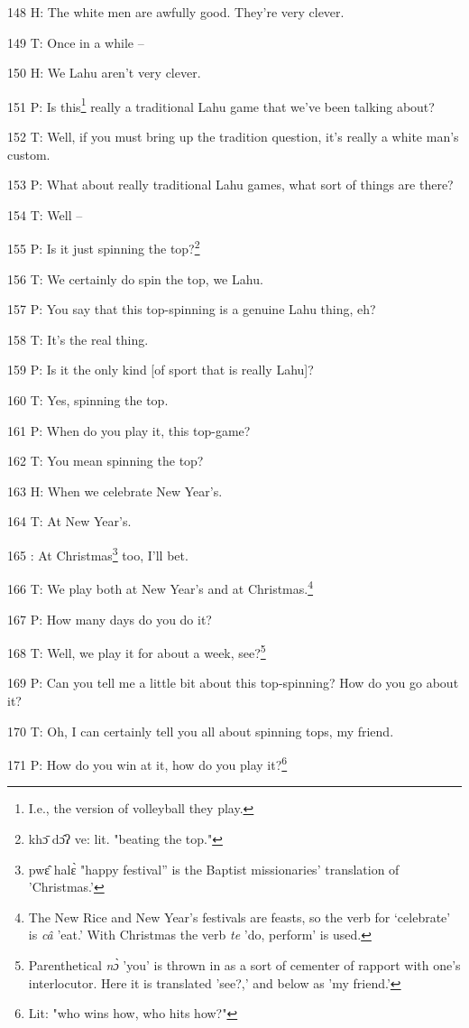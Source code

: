 148 H: The white men are awfully good. They're very clever.

149 T: Once in a while --

150 H: We Lahu aren't very clever.

151 P: Is this\footnote{I.e., the version of volleyball they play.} really a traditional Lahu game that we've been talking about?

152 T: Well, if you must bring up the tradition question, it's really a white man's
custom.

153 P: What about really traditional Lahu games, what sort of things are there?

154 T: Well --

155 P: Is it just spinning the top?\footnote{khɔ̄ dɔ̂ʔ ve: lit. "beating the top."}

156 T: We certainly do spin the top, we Lahu.

157 P: You say that this top-spinning is a genuine Lahu thing, eh?

158 T: It's the real thing.

159 P: Is it the only kind [of sport that is really Lahu]?

160 T: Yes, spinning the top.

161 P: When do you play it, this top-game?

162 T: You mean spinning the top?

163 H: When we celebrate New Year's.

164 T: At New Year's.

165 : At Christmas\footnote{pwɛ̂ halɛ̀ "happy festival'' is the Baptist missionaries' translation of 'Christmas.'} too, I'll bet.

166 T: We play both at New Year's and at Christmas.\footnote{The New Rice and New Year's festivals are feasts, so the verb for `celebrate' is \textit{câ} 'eat.' With Christmas the verb \textit{te} 'do, perform' is used.}

167 P: How many days do you do it?

168 T: Well, we play it for about a week, see?\footnote{Parenthetical \textit{nɔ̀} 'you' is thrown in as a sort of cementer of rapport with one's interlocutor. Here it is translated 'see?,' and below as 'my friend.'}

169 P: Can you tell me a little bit about this top-spinning? How do you go about
it?

170 T: Oh, I can certainly tell you all about spinning tops, my friend.

171 P: How do you win at it, how do you play it?\footnote{Lit: "who wins how, who hits how?"}

